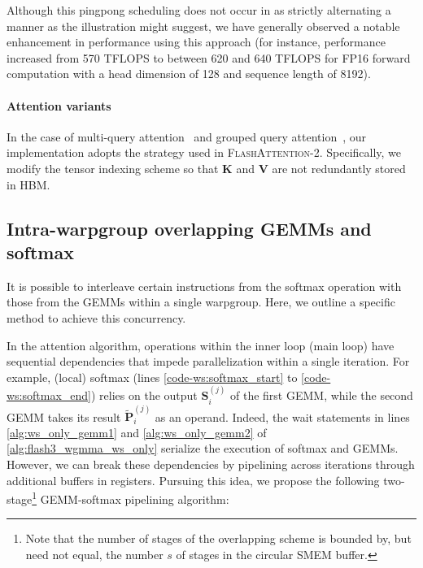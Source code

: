 Although this pingpong scheduling does not occur in as strictly alternating a manner as the illustration might suggest, we have generally observed a notable enhancement in performance using this approach (for instance, performance increased from 570 TFLOPS to between 620 and 640 TFLOPS for FP16 forward computation with a head dimension of 128 and sequence length of 8192).

\paragraph{Attention variants} In the case of multi-query attention~\citep{shazeer2019fast} and grouped query attention~\citep{ainslie2023gqa}, our implementation adopts the strategy used in \textsc{FlashAttention-2}. Specifically, we modify the tensor indexing scheme so that $\mathbf{K}$ and $\mathbf{V}$ are not redundantly stored in HBM.

\subsection{Intra-warpgroup overlapping GEMMs and softmax}

It is possible to interleave certain instructions from the softmax operation with those from the GEMMs within a single warpgroup. Here, we outline a specific method to achieve this concurrency.

In the attention algorithm, operations within the inner loop (main loop) have sequential dependencies that impede parallelization within a single iteration. For example, (local) softmax (lines \ref{code-ws:softmax_start} to \ref{code-ws:softmax_end}) relies on the output $\mathbf{S}_i^{(j)}$ of the first GEMM, while the second GEMM takes its result $\widetilde{\mathbf{P}}_i^{(j)}$ as an operand. Indeed, the wait statements in lines \ref{alg:ws_only_gemm1} and \ref{alg:ws_only_gemm2} of \cref{alg:flash3_wgmma_ws_only} serialize the execution of softmax and GEMMs. However, we can break these dependencies by pipelining across iterations through additional buffers in registers. Pursuing this idea, we propose the following two-stage\footnote{Note that the number of stages of the overlapping scheme is bounded by, but need not equal, the number $s$ of stages in the circular SMEM buffer.} GEMM-softmax pipelining algorithm:

